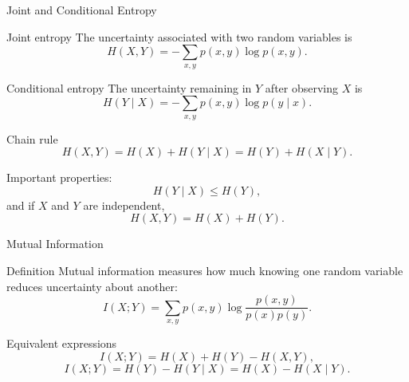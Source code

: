 \documentclass[aspectratio=169,12pt]{beamer}
\begin{document}
\begin{frame}[t]{Joint and Conditional Entropy}
	\vspace{0.2cm}
	
	\begin{block}{Joint entropy}
		The uncertainty associated with two random variables is
		\[
		H(X,Y)
		=
		-\sum_{x,y}p(x,y)\log p(x,y).
		\]
	\end{block}
	
	\begin{block}{Conditional entropy}
		The uncertainty remaining in $Y$ after observing $X$ is
		\[
		H(Y\mid X)
		=
		-\sum_{x,y}p(x,y)\log p(y\mid x).
		\]
	\end{block}
	
	\begin{exampleblock}{Chain rule}
		\[
		H(X,Y)=H(X)+H(Y\mid X)
		=H(Y)+H(X\mid Y).
		\]
	\end{exampleblock}
	
	Important properties:
	\[
	H(Y\mid X)\leq H(Y),
	\]
	and if $X$ and $Y$ are independent,
	\[
	H(X,Y)=H(X)+H(Y).
	\]
\end{frame}

\begin{frame}[t]{Mutual Information}
	\vspace{0.2cm}
	
	\begin{block}{Definition}
		Mutual information measures how much knowing one random variable
		reduces uncertainty about another:
		\[
		I(X;Y)
		=
		\sum_{x,y}p(x,y)
		\log
		\frac{p(x,y)}{p(x)p(y)}.
		\]
	\end{block}
	
	\begin{exampleblock}{Equivalent expressions}
		\[
		I(X;Y)
		=
		H(X)+H(Y)-H(X,Y),
		\]
		\[
		I(X;Y)
		=
		H(Y)-H(Y\mid X)
		=
		H(X)-H(X\mid Y).
		\]
	\end{exampleblock}
	
\end{frame}
\end{document}

